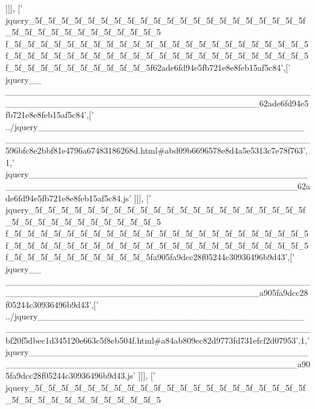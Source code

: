 \begin{DoxyCode}
      ]]],
  [\textcolor{stringliteral}{'
      jquery\_5f\_5f\_5f\_5f\_5f\_5f\_5f\_5f\_5f\_5f\_5f\_5f\_5f\_5f\_5f\_5f\_5f\_5f\_5f\_5f\_5f\_5f\_5f\_5f\_5f\_5f\_5f\_5f\_5f\_5f\_5f\_5f\_5
      f\_5f\_5f\_5f\_5f\_5f\_5f\_5f\_5f\_5f\_5f\_5f\_5f\_5f\_5f\_5f\_5f\_5f\_5f\_5f\_5f\_5f\_5f\_5f\_5f\_5f\_5f\_5f\_5f\_5f\_5f\_5f\_5f\_5f\_5f\_5f\_5f\_5f\_5f\_5f\_5f\_5f\_5f\_5f\_5f\_5f\_5f\_5f\_5f\_5f\_5f\_5f\_5f\_5f\_5f\_5f\_5f\_5f62ade6fd94e5fb721e8e8feb15af5c84'},[\textcolor{stringliteral}{'
      jquery\_\_
      \_\_\_\_\_\_\_\_\_\_\_\_\_\_\_\_\_\_\_\_\_\_\_\_\_\_\_\_\_\_\_\_\_\_\_\_\_\_\_\_\_\_\_\_\_\_\_\_\_\_\_\_\_\_\_\_\_\_\_\_\_\_\_\_\_\_\_\_\_\_\_\_\_\_\_\_\_\_\_\_\_\_\_\_\_\_\_\_62ade6fd94e5fb721e8e8feb15af5c84'},[\textcolor{stringliteral}{'
      ../jquery\_\_\_\_\_\_\_\_\_\_\_\_\_\_\_\_\_\_\_\_\_\_\_\_\_\_\_\_\_\_\_\_\_\_\_\_\_\_\_\_\_\_\_\_\_\_\_\_\_\_\_\_\_\_\_\_\_\_\_\_\_\_\_\_\_\_\_\_\_\_\_\_\_\_\_\_\_\_\_\_\_\_\_\_\_\_\_\_\_\_596bfc8e2bbf81e4796a67483186268d.html#abd09b6696578e8d4a5e5313c7e78f763'},1,\textcolor{stringliteral}{'
      jquery\_\_\_\_\_\_\_\_\_\_\_\_\_\_\_\_\_\_\_\_\_\_\_\_\_\_\_\_\_\_\_\_\_\_\_\_\_\_\_\_\_\_\_\_\_\_\_\_\_\_\_\_\_\_\_\_\_\_\_\_\_\_\_\_\_\_\_\_\_\_\_\_\_\_\_\_\_\_\_\_\_\_\_\_\_\_\_\_\_\_62ade6fd94e5fb721e8e8feb15af5c84.js'}
      ]]],
  [\textcolor{stringliteral}{'
      jquery\_5f\_5f\_5f\_5f\_5f\_5f\_5f\_5f\_5f\_5f\_5f\_5f\_5f\_5f\_5f\_5f\_5f\_5f\_5f\_5f\_5f\_5f\_5f\_5f\_5f\_5f\_5f\_5f\_5f\_5f\_5f\_5f\_5
      f\_5f\_5f\_5f\_5f\_5f\_5f\_5f\_5f\_5f\_5f\_5f\_5f\_5f\_5f\_5f\_5f\_5f\_5f\_5f\_5f\_5f\_5f\_5f\_5f\_5f\_5f\_5f\_5f\_5f\_5f\_5f\_5f\_5f\_5f\_5f\_5f\_5f\_5f\_5f\_5f\_5f\_5f\_5f\_5f\_5f\_5f\_5f\_5f\_5f\_5f\_5f\_5f\_5f\_5f\_5f\_5f\_5fa905fa9dcc28f05244c30936496b9d43'},[\textcolor{stringliteral}{'
      jquery\_\_
      \_\_\_\_\_\_\_\_\_\_\_\_\_\_\_\_\_\_\_\_\_\_\_\_\_\_\_\_\_\_\_\_\_\_\_\_\_\_\_\_\_\_\_\_\_\_\_\_\_\_\_\_\_\_\_\_\_\_\_\_\_\_\_\_\_\_\_\_\_\_\_\_\_\_\_\_\_\_\_\_\_\_\_\_\_\_\_\_a905fa9dcc28f05244c30936496b9d43'},[\textcolor{stringliteral}{'
      ../jquery\_\_\_\_\_\_\_\_\_\_\_\_\_\_\_\_\_\_\_\_\_\_\_\_\_\_\_\_\_\_\_\_\_\_\_\_\_\_\_\_\_\_\_\_\_\_\_\_\_\_\_\_\_\_\_\_\_\_\_\_\_\_\_\_\_\_\_\_\_\_\_\_\_\_\_\_\_\_\_\_\_\_\_\_\_\_\_\_\_\_bf20f5dbec1d345120e663c5f8eb504f.html#a84ab809ec82d9773fd731efcf2d07953'},1,\textcolor{stringliteral}{'
      jquery\_\_\_\_\_\_\_\_\_\_\_\_\_\_\_\_\_\_\_\_\_\_\_\_\_\_\_\_\_\_\_\_\_\_\_\_\_\_\_\_\_\_\_\_\_\_\_\_\_\_\_\_\_\_\_\_\_\_\_\_\_\_\_\_\_\_\_\_\_\_\_\_\_\_\_\_\_\_\_\_\_\_\_\_\_\_\_\_\_\_a905fa9dcc28f05244c30936496b9d43.js'}
      ]]],
  [\textcolor{stringliteral}{'
      jquery\_5f\_5f\_5f\_5f\_5f\_5f\_5f\_5f\_5f\_5f\_5f\_5f\_5f\_5f\_5f\_5f\_5f\_5f\_5f\_5f\_5f\_5f\_5f\_5f\_5f\_5f\_5f\_5f\_5f\_5f\_5f\_5f\_5
}
\end{DoxyCode}

